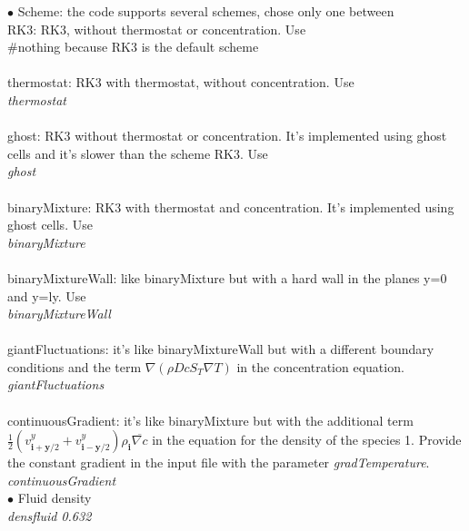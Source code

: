 \documentclass[aps,prl]{revtex4}
\newcommand{\bd}{\boldsymbol}
\begin{document}
$\bullet$ Scheme: the code supports several schemes, chose only one between \\
RK3: RK3, without thermostat or concentration. Use \\
\emph{}\#nothing because RK3 is the default scheme \\ \\
thermostat: RK3 with thermostat, without concentration. Use \\
\emph{thermostat} \\ \\
ghost: RK3 without thermostat or concentration. It's 
implemented using ghost cells and it's slower than the
scheme RK3. Use \\
\emph{ghost} \\ \\
binaryMixture: RK3 with thermostat and concentration. It's 
implemented using ghost cells. Use \\
\emph{binaryMixture} \\ \\
binaryMixtureWall: like binaryMixture but with a hard wall in 
the planes y=0 and y=ly. Use \\
\emph{binaryMixtureWall} \\ \\
giantFluctuations: it's like binaryMixtureWall but with a different boundary conditions and
the term $\nabla (\rho D cS_T \nabla T)$ in the concentration equation. \\
\emph{giantFluctuations} \\ \\
continuousGradient: it's like binaryMixture but with the additional term 
$\frac{1}{2}(v_{\bd{i}+\bd{y}/2}^y+v_{\bd{i}-\bd{y}/2}^y)\rho_{\bd{i}}\overline{\nabla c}$
in the equation for the density of the species 1. Provide
the constant gradient in the input file with the parameter \emph{gradTemperature}. \\
\emph{continuousGradient} \\


$\bullet$ Fluid density \\
\emph{densfluid               0.632} \\ \\
\end{document}
